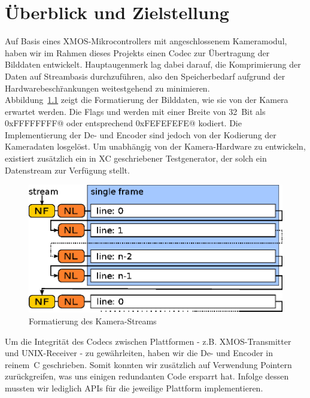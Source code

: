 
\chapter{\"Uberblick und Zielstellung}
Auf Basis eines XMOS-Mikrocontrollers mit angeschlossenem Kameramodul, haben wir
im Rahmen dieses Projekts einen Codec zur \"Ubertragung der Bilddaten entwickelt.
Hauptaugenmerk lag dabei darauf, die Komprimierung der Daten auf Streambasis
durchzuf\"uhren, also den Speicherbedarf aufgrund der Hardwarebesch\"rankungen 
weitestgehend zu minimieren.\\
Abbildung~\ref{fig:cam-stream} zeigt die Formatierung der Bilddaten, wie sie von
der Kamera erwartet werden. Die Flags \verb@NEWFRAME@ und \verb@NEWLINE@ werden mit einer
Breite von 32~Bit als \verb@0xFFFFFFFF@ oder entsprechend \verb@0xFEFEFEFE@ kodiert. Die
Implementierung der De- und Encoder sind jedoch von der Kodierung der
Kameradaten losgel\"ost. Um unabh\"angig von der Kamera-Hardware zu entwickeln,
existiert zus\"atzlich ein in XC geschriebener Testgenerator, der solch ein
Datenstream zur Verf\"ugung stellt.
%
\begin{figure}[htbp]
\begin{center}
\includegraphics{img/cam-stream}
\end{center}
\caption{Formatierung des Kamera-Streams}
\label{fig:cam-stream}
\end{figure}

Um die Integrit\"at des Codecs zwischen Plattformen - z.B. XMOS-Transmitter 
und UNIX-Receiver - zu gew\"ahrleiten, haben wir die De- und Encoder
in reinem~C geschrieben. Somit konnten wir zus\"atzlich auf Verwendung Pointern
zur\"uckgreifen, was uns einigen redundanten Code ersparrt hat. Infolge dessen
mussten wir lediglich APIs f\"ur die jeweilige Plattform implementieren.
